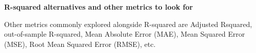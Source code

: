 \textbf{R-squared alternatives and other metrics to look for}

Other metrics commonly explored alongside R-squared are Adjusted Rsquared, out-of-sample R-squared, Mean Absolute Error (MAE), Mean Squared Error (MSE), Root Mean Squared Error (RMSE), etc.




















